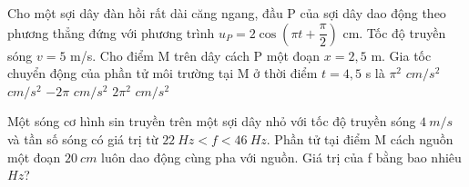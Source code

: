 \begin{ex}%
Cho một sợi dây đàn hồi rất dài căng ngang, đầu P của sợi dây dao động theo phương thẳng đứng với phương trình $u_P=2\cos(\pi t + \dfrac{\pi}{2})$ cm. Tốc độ truyền sóng $v=5$ m/s. Cho điểm M trên dây cách P một đoạn $x=2,5$ m. Gia tốc chuyển động của phần tử môi trường tại M ở thời điểm $t=4,5$ s là
\choice
{$\pi ^2$ $cm/s^2$}
{ $cm/s^2$}
{$-2\pi$ $cm/s^2$}
{$2\pi ^2$ $cm/s^2$}
\end{ex} 









\begin{ex}%
Một sóng cơ hình sin truyền trên một sợi dây nhỏ với tốc độ truyền sóng $4 ~m/s$ và tần số sóng có giá trị từ $22 ~Hz<f<46 ~Hz$. Phần tử tại điểm M cách nguồn một đoạn $20 ~cm$ luôn dao động cùng pha với nguồn. Giá trị của f bằng bao nhiêu $H z$?\\  
\end{ex} 





